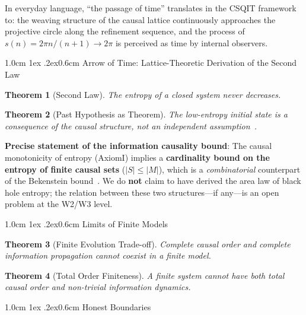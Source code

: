 \documentclass[aps,prd,twocolumn,nofootinbib,floatfix]{revtex4-2}
\makeatletter
\newtheorem{theorem}{Theorem}
\def\section{%
  \@startsection{section}{1}{\z@}
    {1.0cm \@plus1ex \@minus .2ex}{0.6cm}
    {\normalfont\large\bfseries\centering}%
}
\makeatother
\begin{document}
In everyday language, ``the passage of time'' translates in the CSQIT framework to: the weaving structure of the causal lattice continuously approaches the projective circle along the refinement sequence, and the process of $s(n) = 2\pi n/(n+1) \to 2\pi$ is perceived as time by internal observers.

\section{Arrow of Time: Lattice-Theoretic Derivation of the Second Law}

\begin{theorem}[Second Law]
The entropy of a closed system never decreases.
\end{theorem}

\begin{theorem}[Past Hypothesis as Theorem]
The low-entropy initial state is a consequence of the causal structure, not an independent assumption~\cite{Penrose2004}.
\end{theorem}

\noindent\textbf{Precise statement of the information causality bound}: The causal monotonicity of entropy (AxiomI) implies a \textbf{cardinality bound on the entropy of finite causal sets} ($|S| \le |M|$), which is a \textit{combinatorial} counterpart of the Bekenstein bound~\cite{Bekenstein1973}. We do \textbf{not} claim to have derived the area law of black hole entropy; the relation between these two structures---if any---is an open problem at the W2/W3 level.

\section{Limits of Finite Models}

\begin{theorem}[Finite Evolution Trade-off]
Complete causal order and complete information propagation cannot coexist in a finite model.
\end{theorem}

\begin{theorem}[Total Order Finiteness]
A finite system cannot have both total causal order and non-trivial information dynamics.
\end{theorem}

\section{Honest Boundaries}
\end{document}
